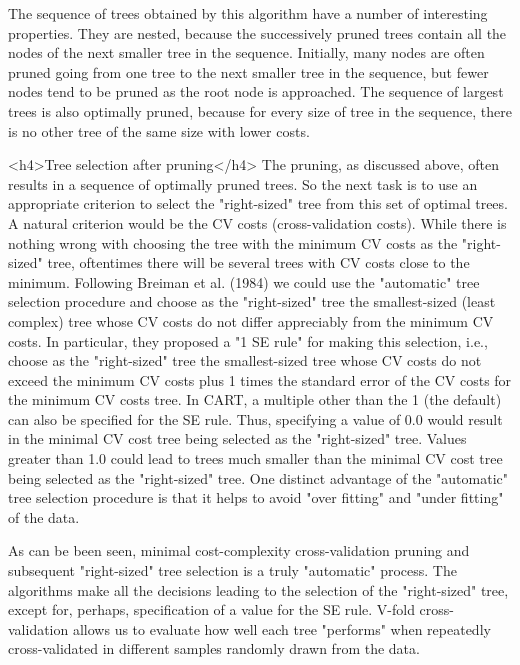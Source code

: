 The sequence of trees obtained by this algorithm have a number of interesting properties. They are nested, because the successively pruned trees contain all the nodes of the next smaller tree in the sequence. Initially, many nodes are often pruned going from one tree to the next smaller tree in the sequence, but fewer nodes tend to be pruned as the root node is approached. The sequence of largest trees is also optimally pruned, because for every size of tree in the sequence, there is no other tree of the same size with lower costs. 

<h4>Tree selection after pruning</h4>
The pruning, as discussed above, often results in a sequence of optimally pruned trees. So the next task is to use an appropriate criterion to select the "right-sized" tree from this set of optimal trees. A natural criterion would be the CV costs (cross-validation costs). While there is nothing wrong with choosing the tree with the minimum CV costs as the "right-sized" tree, oftentimes there will be several trees with CV costs close to the minimum. Following Breiman et al. (1984) we could use the "automatic" tree selection procedure and choose as the "right-sized" tree the smallest-sized (least complex) tree whose CV costs do not differ appreciably from the minimum CV costs. In particular, they proposed a "1 SE rule" for making this selection, i.e., choose as the "right-sized" tree the smallest-sized tree whose CV costs do not exceed the minimum CV costs plus 1 times the standard error of the CV costs for the minimum CV costs tree. In CART, a multiple other than the 1 (the default) can also be specified for the SE rule. Thus, specifying a value of 0.0 would result in the minimal CV cost tree being selected as the "right-sized" tree. Values greater than 1.0 could lead to trees much smaller than the minimal CV cost tree being selected as the "right-sized" tree. One distinct advantage of the "automatic" tree selection procedure is that it helps to avoid "over fitting" and "under fitting" of the data.

As can be been seen, minimal cost-complexity cross-validation pruning and subsequent "right-sized" tree selection is a truly "automatic" process. The algorithms make all the decisions leading to the selection of the "right-sized" tree, except for, perhaps, specification of a value for the SE rule. V-fold cross-validation allows us to evaluate how well each tree "performs" when repeatedly cross-validated in different samples randomly drawn from the data.



